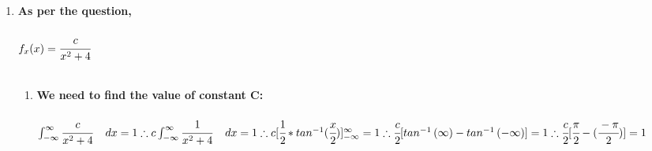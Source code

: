 \documentclass{article}
\begin{document}
\begin{enumerate}
\item\textbf{As per the question,}\\\\
$f_x(x)=\cfrac{c}{x^2+4}$\\\\
\begin{enumerate}
    \item \textbf{We need to find the value of constant C: }\\\\
\begin{math}
\int_{-\infty}^{\infty} \cfrac{c}{x^2+4} \hspace{4mm}dx = 1\\\\\\
\therefore c \int_{-\infty}^{\infty} \cfrac{1}{x^2+4} \hspace{4mm}dx = 1\\\\\\
\therefore c [ \cfrac{1}{2} * tan^{-1} ( \cfrac{x}{2} ) ]_{-\infty}^{\infty} = 1\\\\\\
\therefore \cfrac{c}{2} [  tan^{-1} \left( {\infty} \right) - tan^{-1} \left( {-\infty} \right) ] = 1\\\\\\
\therefore \cfrac{c}{2}  [ \cfrac{\pi}{2} - (\cfrac{-\pi}{2})] = 1\\\\\\
\end{math}


\end{enumerate}
\end{enumerate}
\end{document}
